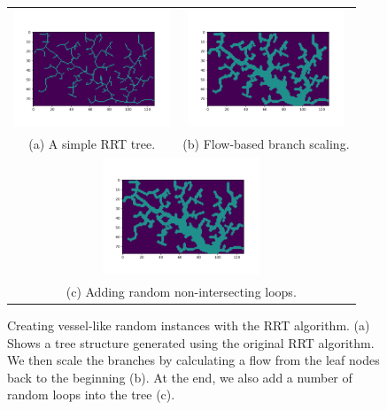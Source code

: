 \begin{figure}[ht]
    \begin{center}
    \begin{tabular}{cc}
    \includegraphics[clip, trim=58 62 45 60, height=3.5cm]{figures/implementation/rrt_base.png} &
    \includegraphics[clip, trim=58 62 45 60, height=3.5cm]{figures/implementation/rrt_base_flow.png} \\
    {\footnotesize (a) A simple RRT tree.} &
    {\footnotesize (b) Flow-based branch scaling.} \\
    \multicolumn{2}{c}{\includegraphics[clip, trim=58 62 45 60, height=3.5cm]{figures/implementation/rrt_base_loops.png}} \\
    \multicolumn{2}{c}{{\footnotesize (c) Adding random non-intersecting loops.}}
    \end{tabular}
    \end{center}
    \caption[Random Instance Generation]{Creating vessel-like random instances with the RRT algorithm. (a) Shows a tree structure generated using the original RRT algorithm. We then scale the branches by calculating a flow from the leaf nodes back to the beginning (b). At the end, we also add a number of random loops into the tree (c).}
    \label{fig:RRRTrees}
  \end{figure}

